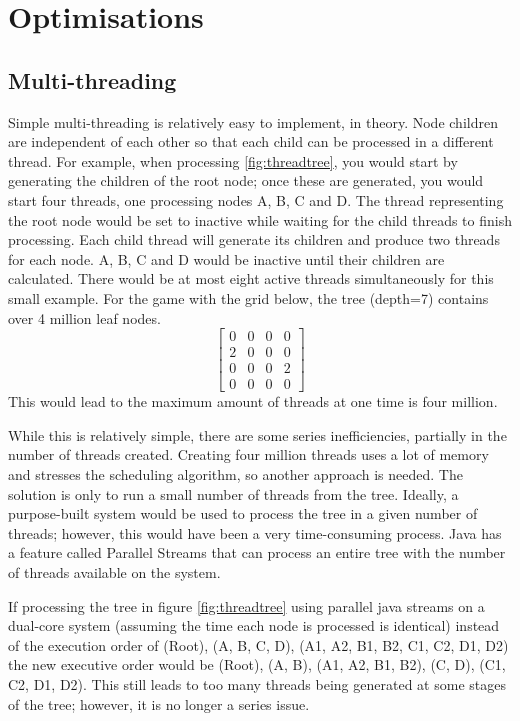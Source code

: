 \documentclass{article}
\begin{document}
\newpage
\section{Optimisations}  
\subsection{Multi-threading}
Simple multi-threading is relatively easy to implement, in theory. Node children are independent of each other so that each child can be processed in a different thread. For example, when processing \ref{fig:threadtree}, you would start by generating the children of the root node; once these are generated, you would start four threads, one processing nodes A, B, C and D. The thread representing the root node would be set to inactive while waiting for the child threads to finish processing. Each child thread will generate its children and produce two threads for each node. A, B, C and D would be inactive until their children are calculated. There would be at most eight active threads simultaneously for this small example. For the game with the grid below, the tree (depth=7) contains over 4 million leaf nodes.
$$
\begin{bmatrix}
     0 &0 &0 &0 \\2 &0 &0 &0 \\0 &0 &0 &2 \\0 &0 &0 &0
\end{bmatrix}
$$
This would lead to the maximum amount of threads at one time is four million.

While this is relatively simple, there are some series inefficiencies, partially in the number of threads created. Creating four million threads uses a lot of memory and stresses the scheduling algorithm, so another approach is needed. The solution is only to run a small number of threads from the tree. Ideally, a purpose-built system would be used to process the tree in a given number of threads; however, this would have been a very time-consuming process. Java has a feature called Parallel Streams \cite{pstreams} that can process an entire tree with the number of threads available on the system.

If processing the tree in figure \ref{fig:threadtree} using parallel java streams on a dual-core system (assuming the time each node is processed is identical) instead of the execution order of (Root), (A, B, C, D), (A1, A2, B1, B2, C1, C2, D1, D2) the new executive order would be (Root), (A, B), (A1, A2, B1, B2), (C, D), (C1, C2, D1, D2). This still leads to too many threads being generated at some stages of the tree; however, it is no longer a series issue.
\end{document}
